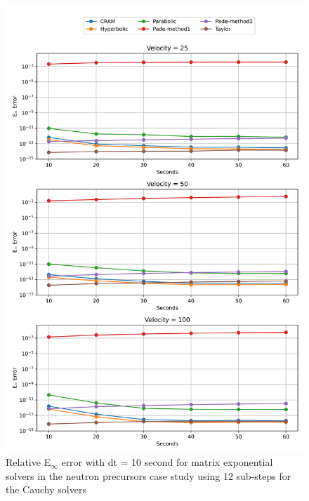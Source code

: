 \begin{figure}[p]
    \centering
    \includegraphics[width=5in]{images/chapter-5/caseStudies/neutronPrecursors/dt10/neutronPrecursorsEinfErrorerrorSteps12.png}
    \caption{Relative E$_{\infty}$ error with dt = 10 second for matrix exponential solvers in the neutron precursors case study using 12 sub-steps for the Cauchy solvers}
    \label{fig:neutron_precursors_Einf_dt10_steps12}
\end{figure}

\clearpage

